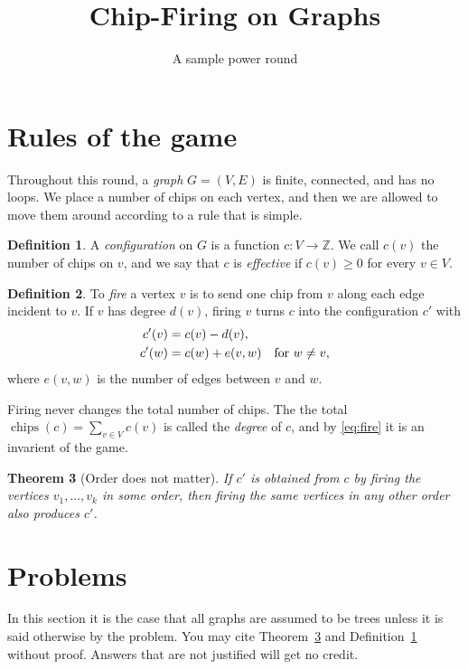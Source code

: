 \documentclass[11pt]{article}
\title{Chip-Firing on Graphs}
\author{A sample power round}
\date{}
\newtheorem{theorem}{Theorem}[section]
\theoremstyle{definition}
\newtheorem{definition}[theorem]{Definition}
\newcommand{\Z}{\mathbb{Z}}
\DeclareMathOperator{\chips}{chips}
\begin{document}
\maketitle

\section{Rules of the game}

Throughout this round, a \emph{graph} $G = (V, E)$ is finite, connected, and has no loops. We place a number of chips on each vertex, and then we are allowed to move them around according to a rule that is simple.

\begin{definition}\label{def:config}
A \emph{configuration} on $G$ is a function $c \colon V \to \Z$. We call $c(v)$ the number of chips on $v$, and we say that $c$ is \emph{effective} if $c(v) \ge 0$ for every $v \in V$.
\end{definition}

\begin{definition}
To \emph{fire} a vertex $v$ is to send one chip from $v$ along each edge incident to $v$. If $v$ has degree $d(v)$, firing $v$ turns $c$ into the configuration $c'$ with
\begin{align}
  c'(v) &= c(v) - d(v), \label{eq:fire} \\
  c'(w) &= c(w) + e(v, w) \quad \text{for } w \neq v, \notag
\end{align}
where $e(v, w)$ is the number of edges between $v$ and $w$.
\end{definition}

Firing never changes the total number of chips. The the total $\chips(c) = \sum_{v \in V} c(v)$ is called the \emph{degree} of $c$, and by \eqref{eq:fire} it is an invarient of the game.

\begin{theorem}[Order does not matter]\label{thm:abelian}
If $c'$ is obtained from $c$ by firing the vertices $v_1, \dots, v_k$ in some order, then firing the same vertices in any other order also produces $c'$.
\end{theorem}

\section{Problems}

In this section it is the case that all graphs are assumed to be trees unless it is said otherwise by the problem. You may cite Theorem~\ref{thm:abelian} and Definition~\ref{def:config} without proof. Answers that are not justified will get no credit.
\end{document}
